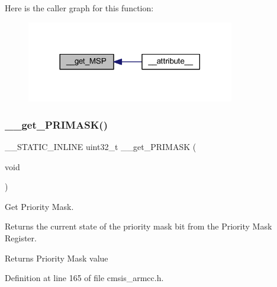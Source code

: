 Here is the caller graph for this function\+:
\nopagebreak
\begin{figure}[H]
\begin{center}
\leavevmode
\includegraphics[width=257pt]{group___c_m_s_i_s___core___reg_acc_functions_gac5267c10c9b15b5349eea0a959ea014c_icgraph}
\end{center}
\end{figure}
\mbox{\label{group___c_m_s_i_s___core___reg_acc_functions_gac9e3a67ff722261b89c77ebe49b6f9a7}} 
\subsubsection{\texorpdfstring{\+\_\+\+\_\+get\+\_\+\+P\+R\+I\+M\+A\+S\+K()}{\_\_get\_PRIMASK()}}
{\footnotesize\ttfamily \+\_\+\+\_\+\+S\+T\+A\+T\+I\+C\+\_\+\+I\+N\+L\+I\+NE uint32\+\_\+t \+\_\+\+\_\+get\+\_\+\+P\+R\+I\+M\+A\+SK (\begin{DoxyParamCaption}\item[{void}]{ }\end{DoxyParamCaption})}



Get Priority Mask. 

Returns the current state of the priority mask bit from the Priority Mask Register. \begin{DoxyReturn}{Returns}
Priority Mask value 
\end{DoxyReturn}


Definition at line 165 of file cmsis\+\_\+armcc.\+h.

